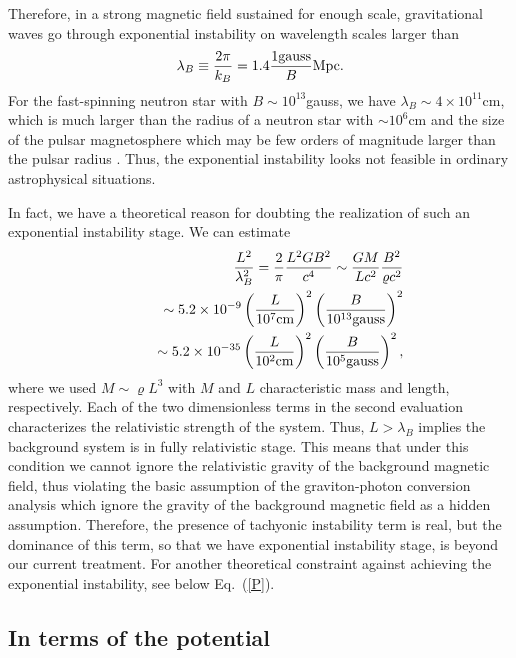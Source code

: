 \documentclass[twocolumn,amsmath,amssymb]{revtex4}
\newcommand{\bea}{\begin{eqnarray}}
\newcommand{\eea}{\end{eqnarray}}
\begin{document}
Therefore, in a strong magnetic field sustained for enough scale, gravitational waves go through exponential instability on wavelength scales larger than
\bea
   \lambda_B \equiv {2 \pi \over k_B}
       = 1.4 {1{\rm gauss} \over B} {\rm Mpc}.
   \label{lambda_B}
\eea
For the fast-spinning neutron star with $B \sim 10^{13}$gauss, we have $\lambda_B \sim 4 \times 10^{11}$cm, which is much larger than the radius of a neutron star with $\sim 10^6$cm and the size of the pulsar magnetosphere which may be few orders of magnitude larger than the pulsar radius \cite{Philippov-2022}. Thus, the exponential instability looks not feasible in ordinary astrophysical situations.

In fact, we have a theoretical reason for doubting the realization of such an exponential instability stage. We can estimate
\bea
   & & {L^2 \over \lambda_B^2}
       = {2 \over \pi} {L^2 G B^2 \over c^4}
       \sim {G M \over L c^2} {B^2 \over \varrho c^2}
   \nonumber \\
   & & \qquad
       \sim 5.2 \times 10^{-9}
       \left( {L \over 10^7 {\rm cm}} \right)^2
       \left( {B \over 10^{13} {\rm gauss}} \right)^2
   \nonumber \\
   & & \qquad
       \sim 5.2 \times 10^{-35}
       \left( {L \over 10^2 {\rm cm}} \right)^2
       \left( {B \over 10^5 {\rm gauss}} \right)^2,
   \label{relativistic}
\eea
where we used $M \sim \varrho L^3$ with $M$ and $L$ characteristic mass and length, respectively. Each of the two dimensionless terms in the second evaluation characterizes the relativistic strength of the system. Thus, $L > \lambda_B$ implies the background system is in fully relativistic stage. This means that under this condition we cannot ignore the relativistic gravity of the background magnetic field, thus violating the basic assumption of the graviton-photon conversion analysis which ignore the gravity of the background magnetic field as a hidden assumption. Therefore, the presence of tachyonic instability term is real, but the dominance of this term, so that we have exponential instability stage, is beyond our current treatment. For another theoretical constraint against achieving the exponential instability, see below Eq.\ (\ref{P}).


\subsection{In terms of the potential}
\end{document}
